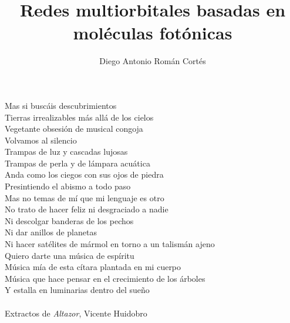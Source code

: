 \documentclass[hyphens]{umemoria}
\author{Diego Antonio Román Cortés}
\title{Redes multiorbitales basadas en moléculas fotónicas}
\begin{document}
\frontmatter
\maketitle

\begin{resumen}

\end{resumen}


\begin{dedicatoria}


Mas si buscáis descubrimientos\\
Tierras irrealizables más allá de los cielos\\
Vegetante obsesión de musical congoja\\
Volvamos al silencio\\

Trampas de luz y cascadas lujosas\\
Trampas de perla y de lámpara acuática\\
Anda como los ciegos con sus ojos de piedra\\
Presintiendo el abismo a todo paso\\
Mas no temas de mí que mi lenguaje es otro\\
No trato de hacer feliz ni desgraciado a nadie\\
Ni descolgar banderas de los pechos\\
Ni dar anillos de planetas\\
Ni hacer satélites de mármol en torno a un talismán ajeno\\
Quiero darte una música de espíritu\\
Música mía de esta cítara plantada en mi cuerpo\\
Música que hace pensar en el crecimiento de los árboles\\
Y estalla en luminarias dentro del sueño\\
\textnormal{\\Extractos de \textit{Altazor}, Vicente Huidobro}
\end{dedicatoria}

\begin{thanks}

\end{thanks}
\end{document}
